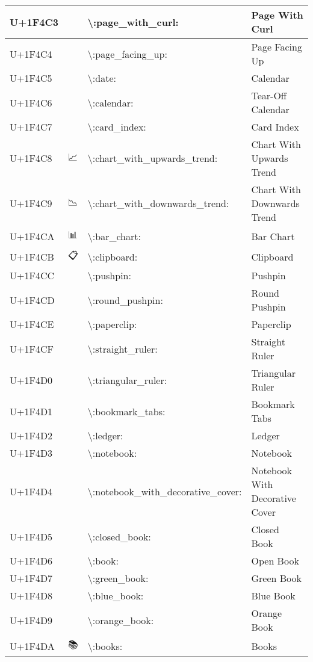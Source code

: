 \begin{table}[h]
\begin{tabulary}{\linewidth}{|L|L|L|L|}
\hline
U+1F4C3 & 📃 & {\textbackslash}:page\_with\_curl: & Page With Curl \\
\hline
U+1F4C4 & 📄 & {\textbackslash}:page\_facing\_up: & Page Facing Up \\
\hline
U+1F4C5 & 📅 & {\textbackslash}:date: & Calendar \\
\hline
U+1F4C6 & 📆 & {\textbackslash}:calendar: & Tear-Off Calendar \\
\hline
U+1F4C7 & 📇 & {\textbackslash}:card\_index: & Card Index \\
\hline
U+1F4C8 & 📈 & {\textbackslash}:chart\_with\_upwards\_trend: & Chart With Upwards Trend \\
\hline
U+1F4C9 & 📉 & {\textbackslash}:chart\_with\_downwards\_trend: & Chart With Downwards Trend \\
\hline
U+1F4CA & 📊 & {\textbackslash}:bar\_chart: & Bar Chart \\
\hline
U+1F4CB & 📋 & {\textbackslash}:clipboard: & Clipboard \\
\hline
U+1F4CC & 📌 & {\textbackslash}:pushpin: & Pushpin \\
\hline
U+1F4CD & 📍 & {\textbackslash}:round\_pushpin: & Round Pushpin \\
\hline
U+1F4CE & 📎 & {\textbackslash}:paperclip: & Paperclip \\
\hline
U+1F4CF & 📏 & {\textbackslash}:straight\_ruler: & Straight Ruler \\
\hline
U+1F4D0 & 📐 & {\textbackslash}:triangular\_ruler: & Triangular Ruler \\
\hline
U+1F4D1 & 📑 & {\textbackslash}:bookmark\_tabs: & Bookmark Tabs \\
\hline
U+1F4D2 & 📒 & {\textbackslash}:ledger: & Ledger \\
\hline
U+1F4D3 & 📓 & {\textbackslash}:notebook: & Notebook \\
\hline
U+1F4D4 & 📔 & {\textbackslash}:notebook\_with\_decorative\_cover: & Notebook With Decorative Cover \\
\hline
U+1F4D5 & 📕 & {\textbackslash}:closed\_book: & Closed Book \\
\hline
U+1F4D6 & 📖 & {\textbackslash}:book: & Open Book \\
\hline
U+1F4D7 & 📗 & {\textbackslash}:green\_book: & Green Book \\
\hline
U+1F4D8 & 📘 & {\textbackslash}:blue\_book: & Blue Book \\
\hline
U+1F4D9 & 📙 & {\textbackslash}:orange\_book: & Orange Book \\
\hline
U+1F4DA & 📚 & {\textbackslash}:books: & Books \\

\end{tabulary}
\end{table}
